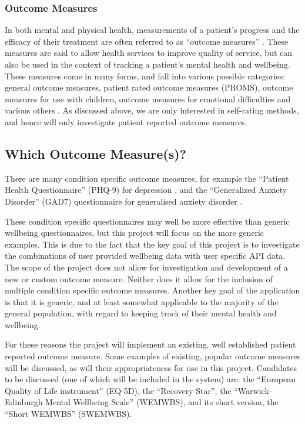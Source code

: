 \documentclass[11pt,openright,a4paper]{report}
\begin{document}
\subsubsection{Outcome Measures}
In both mental and physical health, measurements of a patient's progress and the efficacy of their treatment are often referred to as \enquote{outcome measures} \parencite{pediaoutcomemeasures}. These measures are said to allow health services to improve quality of service, but can also be used in the context of tracking a patient's mental health and wellbeing. These measures come in many forms, and fall into various possible categories: general outcome measures, patient rated outcome measures (PROMS), outcome measures for use with children, outcome measures for emotional difficulties and various others \parencite{mhpoutcomemeasures}. As discussed above, we are only interested in self-rating methods, and hence will only investigate patient reported outcome measures.

\subsection{Which Outcome Measure(s)?} \label{whichoutcomemeasures}
There are many condition specific outcome measures, for example the \enquote{Patient Health Questionnaire} (PHQ-9) for depression \parencite{kroenke2001phq}, and the \enquote{Generalized Anxiety Disorder} (GAD7) questionnaire for generalised anxiety disorder \parencite{spitzer2006brief}.

These condition specific questionnaires may well be more effective than generic wellbeing questionnaires, but this project will focus on the more generic examples. This is due to the fact that the key goal of this project is to investigate the combinations of user provided wellbeing data with user specific API data. The scope of the project does not allow for investigation and development of a new or custom outcome measure. Neither does it allow for the inclusion of multiple condition specific outcome measures. Another key goal of the application is that it is generic, and at least somewhat applicable to the majority of the general population, with regard to keeping track of their mental health and wellbeing.

For these reasons the project will implement an existing, well established patient reported outcome measure. Some examples of existing, popular outcome measures will be discussed, as will their appropriateness for use in this project. Candidates to be discussed (one of which will be included in the system) are: the \enquote{European Quality of Life instrument} (EQ-5D), the \enquote{Recovery Star}, the \enquote{Warwick-Edinburgh Mental Wellbeing Scale} (WEMWBS), and its short version, the \enquote{Short WEMWBS} (SWEMWBS).
\end{document}
